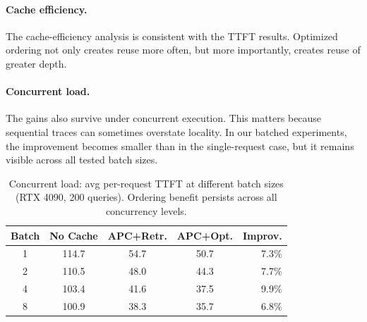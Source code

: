 \documentclass{article}
\begin{document}
\paragraph{Cache efficiency.}
The cache-efficiency analysis is consistent with the TTFT results. Optimized ordering not only creates reuse more often, but more importantly, creates reuse of greater depth.

\begin{table}[t]
\caption{Cache efficiency: prefill saved per request (RTX 4090, 195 queries, No-Cache p50 = 116\,ms in this run; differs from Table~\ref{tab:main}/\ref{tab:baselines} due to independent benchmark runs per Section~\ref{sec:eval}).}
\label{tab:cache_eff}
\centering
\small
{}
\vspace{-0.5em}
\end{table}

\paragraph{Concurrent load.}
The gains also survive under concurrent execution. This matters because sequential traces can sometimes overstate locality. In our batched experiments, the improvement becomes smaller than in the single-request case, but it remains visible across all tested batch sizes.

\begin{table}[t]
\caption{Concurrent load: avg per-request TTFT at different batch sizes (RTX 4090, 200 queries). Ordering benefit persists across all concurrency levels.}
\label{tab:concurrent}
\centering
\small
\begin{tabular}{@{}ccccr@{}}
\toprule
\textbf{Batch} & \textbf{No Cache} & \textbf{APC+Retr.} & \textbf{APC+Opt.} & \textbf{Improv.} \\
\midrule
1 & 114.7 & 54.7 & 50.7 & 7.3\% \\
2 & 110.5 & 48.0 & 44.3 & 7.7\% \\
4 & 103.4 & 41.6 & 37.5 & 9.9\% \\
8 & 100.9 & 38.3 & 35.7 & 6.8\% \\
\bottomrule
\end{tabular}
\vspace{-0.5em}
\end{table}
\end{document}
